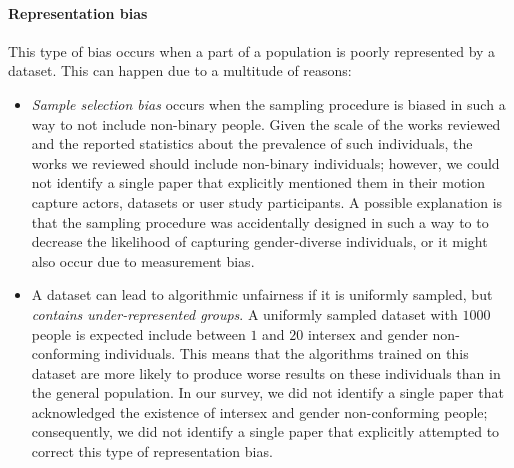 \documentclass[nonacm,sigconf,review,balance=false]{acmart}
\begin{document}
\paragraph*{Representation bias} This type of bias occurs when a part of a population is poorly represented by a dataset. This can happen due to a multitude of reasons:
\begin{itemize}
    \item \emph{Sample selection bias} occurs when the sampling procedure is biased in such a way to not include non-binary people. Given the scale of the works reviewed and the reported statistics about the prevalence of such individuals, the works we reviewed should include non-binary individuals; however, we could not identify a single paper that explicitly mentioned them in their motion capture actors, datasets or user study participants. A possible explanation is that the sampling procedure was accidentally designed in such a way to to decrease the likelihood of capturing gender-diverse individuals, or it might also occur due to measurement bias.
    \item A dataset can lead to algorithmic unfairness if it is uniformly sampled, but \emph{contains under-represented groups}. A uniformly sampled dataset with $1000$ people is expected include between $1$ and $20$ intersex and gender non-conforming individuals. This means that the algorithms trained on this dataset are more likely to produce worse results on these individuals than in the general population. In our survey, we did not identify a single paper that acknowledged the existence of intersex and gender non-conforming people; consequently, we did not identify a single paper that explicitly attempted to correct this type of representation bias. 
\end{itemize}

\end{document}
